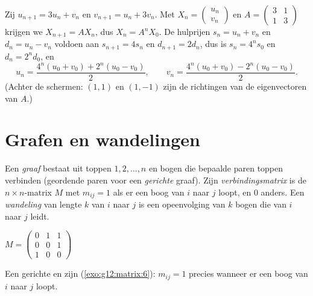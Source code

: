 \begin{example}\label{ex:g12:matrix:coupled}
Zij $u_{n+1} = 3u_n + v_n$ en $v_{n+1} = u_n + 3v_n$. Met
$X_n = \begin{pmatrix} u_n\\ v_n \end{pmatrix}$ en
$A = \begin{pmatrix} 3 & 1\\ 1 & 3\end{pmatrix}$ krijgen we
$X_{n+1} = AX_n$, dus $X_n = A^n X_0$. De hulprijen $s_n = u_n + v_n$ en
$d_n = u_n - v_n$ voldoen aan $s_{n+1} = 4s_n$ en $d_{n+1} = 2d_n$, dus is
$s_n = 4^n s_0$ en $d_n = 2^n d_0$, en
\[
u_n = \frac{4^n(u_0+v_0) + 2^n(u_0-v_0)}{2}, \qquad
v_n = \frac{4^n(u_0+v_0) - 2^n(u_0-v_0)}{2}.
\]
(Achter de schermen: $(1,1)$ en $(1,-1)$ zijn de richtingen van de
eigenvectoren van $A$.)
\end{example}

\section{Grafen en wandelingen}

\begin{definition}\label{def:g12:matrix:graph}
Een \emph{graaf} bestaat uit toppen $1, 2, \dots, n$ en bogen die
bepaalde paren toppen verbinden (geordende paren voor een \emph{gerichte}
graaf). Zijn \emph{verbindingsmatrix} is de
$n \times n$-matrix $M$ met $m_{ij} = 1$ als er een boog van $i$ naar $j$
loopt, en $0$ anders. Een \emph{wandeling} van lengte $k$ van $i$ naar $j$ is
een opeenvolging van $k$ bogen die van $i$ naar $j$ leidt.
\end{definition}

\begin{omfigure}
\qquad\qquad
$M = \begin{pmatrix} 0 & 1 & 1\\ 0 & 0 & 1\\ 1 & 0 & 0 \end{pmatrix}$

{\small Een gerichte  en zijn 
(\cref{exo:g12:matrix:6}): $m_{ij} = 1$ precies wanneer er een boog van $i$
naar $j$ loopt.}
\end{omfigure}


